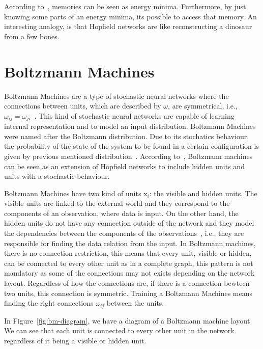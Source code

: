 According to~\cite{bib:hopfield1982}, memories can be seen as energy minima.
Furthermore, by just knowing some parts of an energy minima, its possible to access that memory.
An interesting analogy, is that Hopfield networks are like reconstructing a dinosaur from a few bones.



\section{Boltzmann Machines}%
\label{ch:bm:bm}%

Boltzmann Machines are a type of stochastic neural networks where the connections between units, which are described by $\omega$, are symmetrical, i.e., $\omega_{ij} = \omega_{ji}$~\cite{bib:hertz1991}. 
This kind of stochastic neural networks are capable of learning internal representation and to model an input distribution. 
Boltzmann Machines were named after the Boltzmann distribution. 
Due to its stochatics behaviour, the probability of the state of the system to be found in a certain configuration is given by previous mentioned distribution~\cite{bib:hertz1991}. 
According to~\cite{bib:montufar2018}, Boltzmann machines can be seen as an extension of Hopfield networks to include hidden units and units with a stochastic behaviour.

Boltzmann Machines have two kind of units $\mathrm{x}_{i}$: the visible and hidden units. 
The visible units are linked to the external world and they correspond to the components of an observation, where data is input. On the other hand, the hidden units do not have any connection outside of the network and they model the dependencies between the components of the observations~\cite{bib:fischer2012}, i.e., they are responsible for finding the data relation from the input. 
In Boltzmann machines, there is no connection restriction, this means that every unit, visible or hidden, can be connected to every other unit as in a complete graph, this pattern is not mandatory as some of the connections may not exists depending on the network layout. 
Regardless of how the connections are, if there is a connection bewteen two units, this connection is symmetric. 
Training a Boltzmann Machines means finding the right connections $\omega_{ij}$ between the units.

In Figure~\ref{fig:bm-diagram}, we have a diagram of a Boltzmann machine layout. 
We can see that each unit is connected to every other unit in the network regardless of it being a visible or hidden unit.


